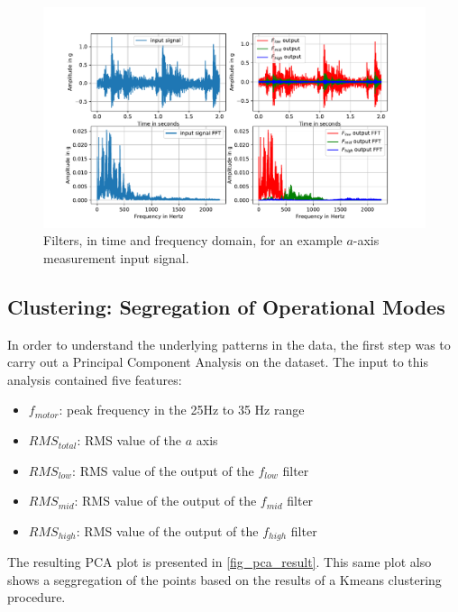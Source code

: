 \documentclass[conference]{IEEEtran}
\begin{document}
\begin{figure}[htbp]
\centerline{\includegraphics[width=\columnwidth]{graphics/filters_sigresponse/filters_sigresponse.pdf}}
\caption{Filters, in time and frequency domain, for an example $a$-axis measurement input signal.}
\label{fig_filters_example_inout}
\end{figure}



\subsection{Clustering: Segregation of Operational Modes}
\label{sec_clustering_results}


In order to understand the underlying patterns in the data, the first step was to carry out a Principal Component Analysis on the dataset. The input to this analysis contained five features:

\begin{itemize}
	\item $f_{motor}$: peak frequency in the 25Hz to 35 Hz range
	\item $RMS_{total}$: RMS value of the $a$ axis
	\item $RMS_{low}$: RMS value of the output of the $f_{low}$ filter
	\item $RMS_{mid}$: RMS value of the output of the $f_{mid}$ filter
	\item $RMS_{high}$: RMS value of the output of the $f_{high}$ filter
\end{itemize}

The resulting PCA plot is presented in \ref{fig_pca_result}. This same plot also shows a seggregation of the points based on the results of a Kmeans clustering procedure.
\end{document}
